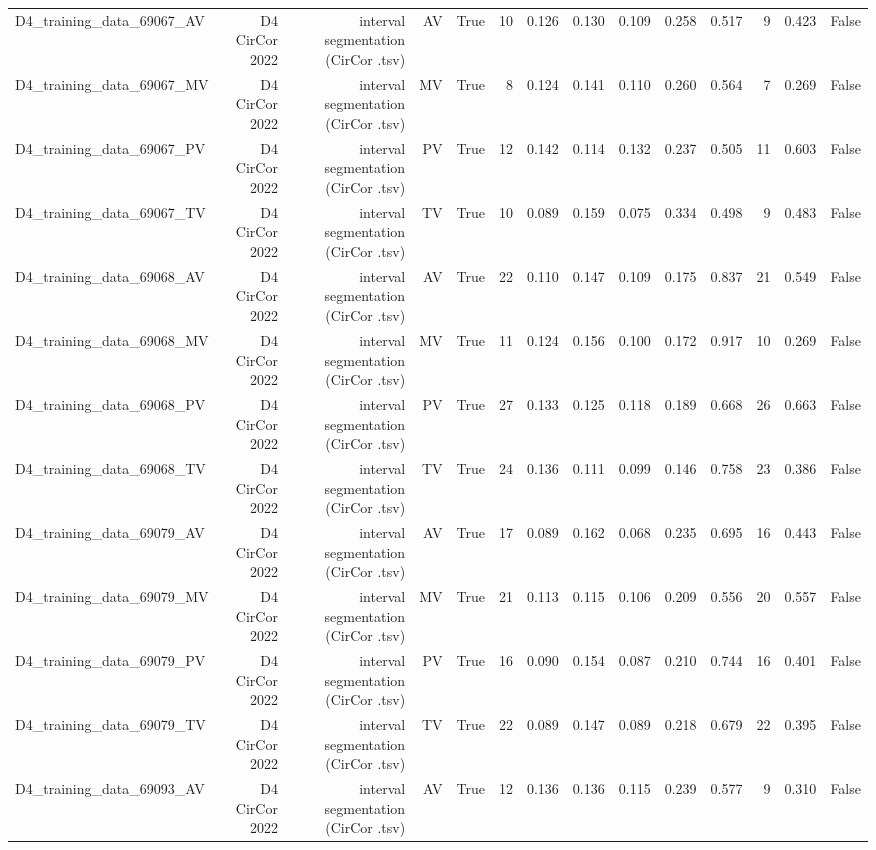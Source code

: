 \begin{table}[htbp]
\begin{tabular}{lrrrrrrrrrrrrr}
    D4\_training\_data\_69067\_AV & D4 CirCor 2022 & interval segmentation (CirCor .tsv) & AV & True & 10 & 0.126 & 0.130 & 0.109 & 0.258 & 0.517 & 9 & 0.423 & False \\
    D4\_training\_data\_69067\_MV & D4 CirCor 2022 & interval segmentation (CirCor .tsv) & MV & True & 8 & 0.124 & 0.141 & 0.110 & 0.260 & 0.564 & 7 & 0.269 & False \\
    D4\_training\_data\_69067\_PV & D4 CirCor 2022 & interval segmentation (CirCor .tsv) & PV & True & 12 & 0.142 & 0.114 & 0.132 & 0.237 & 0.505 & 11 & 0.603 & False \\
    D4\_training\_data\_69067\_TV & D4 CirCor 2022 & interval segmentation (CirCor .tsv) & TV & True & 10 & 0.089 & 0.159 & 0.075 & 0.334 & 0.498 & 9 & 0.483 & False \\
    D4\_training\_data\_69068\_AV & D4 CirCor 2022 & interval segmentation (CirCor .tsv) & AV & True & 22 & 0.110 & 0.147 & 0.109 & 0.175 & 0.837 & 21 & 0.549 & False \\
    D4\_training\_data\_69068\_MV & D4 CirCor 2022 & interval segmentation (CirCor .tsv) & MV & True & 11 & 0.124 & 0.156 & 0.100 & 0.172 & 0.917 & 10 & 0.269 & False \\
    D4\_training\_data\_69068\_PV & D4 CirCor 2022 & interval segmentation (CirCor .tsv) & PV & True & 27 & 0.133 & 0.125 & 0.118 & 0.189 & 0.668 & 26 & 0.663 & False \\
    D4\_training\_data\_69068\_TV & D4 CirCor 2022 & interval segmentation (CirCor .tsv) & TV & True & 24 & 0.136 & 0.111 & 0.099 & 0.146 & 0.758 & 23 & 0.386 & False \\
    D4\_training\_data\_69079\_AV & D4 CirCor 2022 & interval segmentation (CirCor .tsv) & AV & True & 17 & 0.089 & 0.162 & 0.068 & 0.235 & 0.695 & 16 & 0.443 & False \\
    D4\_training\_data\_69079\_MV & D4 CirCor 2022 & interval segmentation (CirCor .tsv) & MV & True & 21 & 0.113 & 0.115 & 0.106 & 0.209 & 0.556 & 20 & 0.557 & False \\
    D4\_training\_data\_69079\_PV & D4 CirCor 2022 & interval segmentation (CirCor .tsv) & PV & True & 16 & 0.090 & 0.154 & 0.087 & 0.210 & 0.744 & 16 & 0.401 & False \\
    D4\_training\_data\_69079\_TV & D4 CirCor 2022 & interval segmentation (CirCor .tsv) & TV & True & 22 & 0.089 & 0.147 & 0.089 & 0.218 & 0.679 & 22 & 0.395 & False \\
    D4\_training\_data\_69093\_AV & D4 CirCor 2022 & interval segmentation (CirCor .tsv) & AV & True & 12 & 0.136 & 0.136 & 0.115 & 0.239 & 0.577 & 9 & 0.310 & False \\

\end{tabular}
\end{table}
